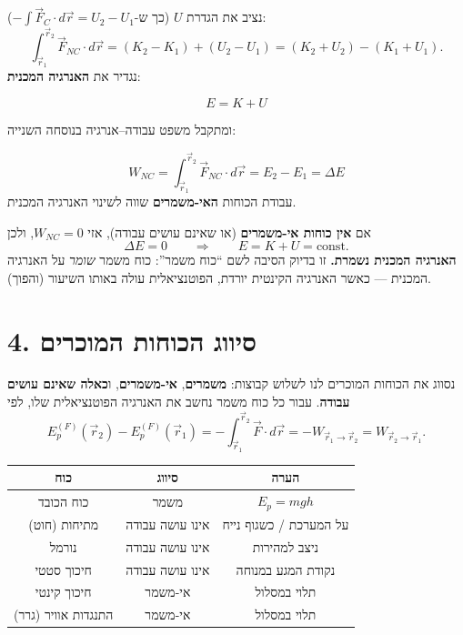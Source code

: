 \documentclass[12pt, a4paper]{article}
\newcommand{\hvec}[1]{\overrightarrow{#1}}
\begin{document}
נציב את הגדרת \textenglish{$U$} (כך ש-\textenglish{$-\int \hvec{F}_C\cdot d\hvec{r} = U_2 - U_1$}):
\[
  \int_{\hvec{r}_1}^{\hvec{r}_2}\!\hvec{F}_{NC}\cdot d\hvec{r}
   = (K_2 - K_1) + (U_2 - U_1)
   = (K_2 + U_2) - (K_1 + U_1).
\]
נגדיר את \textbf{האנרגיה המכנית}:
\begin{tcolorbox}[resultbox, title={אנרגיה מכנית}]
\[
  E = K + U
\]
\end{tcolorbox}

ומתקבל משפט עבודה--אנרגיה בנוסחה השנייה:

\begin{tcolorbox}[resultbox, title={משפט עבודה--אנרגיה II}]
\[
  W_{NC} = \int_{\hvec{r}_1}^{\hvec{r}_2}\!\hvec{F}_{NC}\cdot d\hvec{r}
         = E_2 - E_1 = \Delta E
\]
עבודת הכוחות \textbf{האי-משמרים} שווה לשינוי האנרגיה המכנית.
\end{tcolorbox}

\begin{tcolorbox}[warnbox, title={מקרה פרטי חשוב ביותר --- שימור האנרגיה}]
אם \textbf{אין כוחות אי-משמרים} (או שאינם עושים עבודה), אזי \textenglish{$W_{NC} = 0$}, ולכן
\[
  \Delta E = 0
  \qquad\Longrightarrow\qquad
  E = K + U = \text{const}.
\]
\textbf{האנרגיה המכנית נשמרת.} זו בדיוק הסיבה לשם ``כוח משמר'': כוח משמר \emph{שומר} על האנרגיה המכנית --- כאשר האנרגיה הקינטית יורדת, הפוטנציאלית עולה באותו השיעור (והפוך).
\end{tcolorbox}

\section*{4. סיווג הכוחות המוכרים}

נסווג את הכוחות המוכרים לנו לשלוש קבוצות: \textbf{משמרים}, \textbf{אי-משמרים}, ו\textbf{כאלה שאינם עושים עבודה}. עבור כל כוח משמר נחשב את האנרגיה הפוטנציאלית שלו, לפי
\[
  E_p^{(F)}(\hvec{r}_2) - E_p^{(F)}(\hvec{r}_1)
   = -\int_{\hvec{r}_1}^{\hvec{r}_2}\!\hvec{F}\cdot d\hvec{r}
   = -W_{\hvec{r}_1\to\hvec{r}_2}
   =  W_{\hvec{r}_2\to\hvec{r}_1}.
\]

\begin{center}
\begin{tabular}{|c|c|c|}
\hline
\textbf{כוח} & \textbf{סיווג} & \textbf{הערה} \\
\hline
כוח הכובד          & משמר      & \textenglish{$E_p = mgh$} \\
\hline
מתיחות (חוט)        & אינו עושה עבודה & על המערכת / כשגוף נייח \\
\hline
נורמל              & אינו עושה עבודה & ניצב למהירות \\
\hline
חיכוך סטטי          & אינו עושה עבודה & נקודת המגע במנוחה \\
\hline
חיכוך קינטי         & אי-משמר   & תלוי במסלול \\
\hline
התנגדות אוויר (גרר) & אי-משמר   & תלוי במסלול \\
\hline
\end{tabular}
\end{center}
\end{document}
